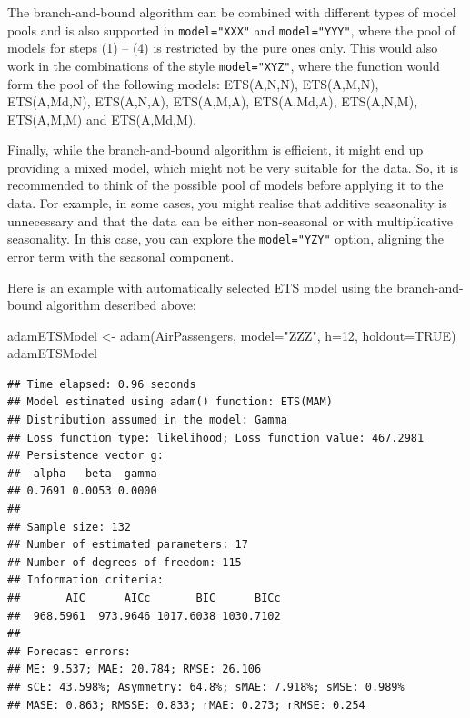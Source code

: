 \documentclass[
]{book}
\newenvironment{Shaded}{\begin{snugshade}}{\end{snugshade}}
\newcommand{\AttributeTok}[1]{\textcolor[rgb]{0.77,0.63,0.00}{#1}}
\newcommand{\ConstantTok}[1]{\textcolor[rgb]{0.00,0.00,0.00}{#1}}
\newcommand{\DecValTok}[1]{\textcolor[rgb]{0.00,0.00,0.81}{#1}}
\newcommand{\FunctionTok}[1]{\textcolor[rgb]{0.00,0.00,0.00}{#1}}
\newcommand{\NormalTok}[1]{#1}
\newcommand{\OtherTok}[1]{\textcolor[rgb]{0.56,0.35,0.01}{#1}}
\newcommand{\StringTok}[1]{\textcolor[rgb]{0.31,0.60,0.02}{#1}}
\theoremstyle{definition}
\theoremstyle{definition}
\theoremstyle{definition}
\theoremstyle{definition}
\theoremstyle{remark}
\begin{document}
The branch-and-bound algorithm can be combined with different types of model pools and is also supported in \texttt{model="XXX"} and \texttt{model="YYY"}, where the pool of models for steps (1) -- (4) is restricted by the pure ones only. This would also work in the combinations of the style \texttt{model="XYZ"}, where the function would form the pool of the following models: ETS(A,N,N), ETS(A,M,N), ETS(A,Md,N), ETS(A,N,A), ETS(A,M,A), ETS(A,Md,A), ETS(A,N,M), ETS(A,M,M) and ETS(A,Md,M).

Finally, while the branch-and-bound algorithm is efficient, it might end up providing a mixed model, which might not be very suitable for the data. So, it is recommended to think of the possible pool of models before applying it to the data. For example, in some cases, you might realise that additive seasonality is unnecessary and that the data can be either non-seasonal or with multiplicative seasonality. In this case, you can explore the \texttt{model="YZY"} option, aligning the error term with the seasonal component.

Here is an example with automatically selected ETS model using the branch-and-bound algorithm described above:

\begin{Shaded}
\begin{Highlighting}[]
\NormalTok{adamETSModel }\OtherTok{\textless{}{-}} \FunctionTok{adam}\NormalTok{(AirPassengers, }\AttributeTok{model=}\StringTok{"ZZZ"}\NormalTok{, }\AttributeTok{h=}\DecValTok{12}\NormalTok{, }\AttributeTok{holdout=}\ConstantTok{TRUE}\NormalTok{)}
\NormalTok{adamETSModel}
\end{Highlighting}
\end{Shaded}

\begin{verbatim}
## Time elapsed: 0.96 seconds
## Model estimated using adam() function: ETS(MAM)
## Distribution assumed in the model: Gamma
## Loss function type: likelihood; Loss function value: 467.2981
## Persistence vector g:
##  alpha   beta  gamma 
## 0.7691 0.0053 0.0000 
## 
## Sample size: 132
## Number of estimated parameters: 17
## Number of degrees of freedom: 115
## Information criteria:
##       AIC      AICc       BIC      BICc 
##  968.5961  973.9646 1017.6038 1030.7102 
## 
## Forecast errors:
## ME: 9.537; MAE: 20.784; RMSE: 26.106
## sCE: 43.598%; Asymmetry: 64.8%; sMAE: 7.918%; sMSE: 0.989%
## MASE: 0.863; RMSSE: 0.833; rMAE: 0.273; rRMSE: 0.254
\end{verbatim}
\end{document}
